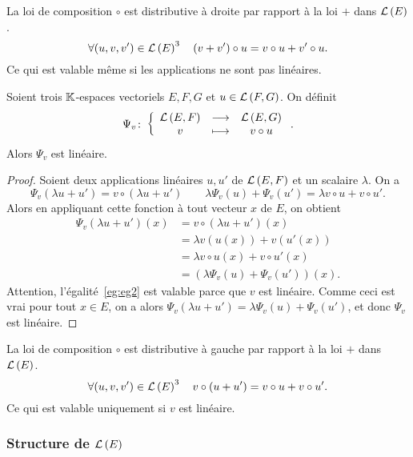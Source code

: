 \begin{cor}
  La loi de composition $\circ$ est distributive à droite par rapport à la loi $+$ dans $\mathcal{L}\left(E\right)$.
  \begin{equation}
    \forall (u,v,v') \in \mathcal{L}\left(E\right)^3 \quad (v+v') \circ u = v \circ u + v' \circ u.
  \end{equation}
  Ce qui est valable même si les applications ne sont pas linéaires.
\end{cor}

\begin{prop}
  Soient trois $\mathbb{K}$-espaces vectoriels $E,F,G$ et $u \in \mathcal{L}\left(F,G\right)$. On définit
  \begin{equation}
  	\Psi_v\colon \left\{\begin{array}{ccc} \mathcal{L}\left(E,F\right) & \longrightarrow &\mathcal{L}\left(E,G\right)\\ v & \longmapsto & v \circ u \end{array} \right..
  \end{equation} 
  Alors $\Psi_v$ est linéaire.
\end{prop}
\begin{proof}
  Soient deux applications linéaires $u,u'$ de $\mathcal{L}\left(E,F\right)$ et un scalaire $\lambda$. On a
  \begin{equation}
    \Psi_v(\lambda u+u')=v \circ (\lambda u+u') \qquad \lambda \Psi_v(u)+\Psi_v(u')=\lambda v \circ u + v \circ u'.
  \end{equation}
  Alors en appliquant cette fonction à tout vecteur $x$ de $E$, on obtient
  \begin{align}
    \Psi_v(\lambda u+u')(x)&=v \circ (\lambda u+u')(x) \\
    &=\lambda v(u(x)) + v(u'(x)) \label{eg:eg2}\\
    &=\lambda v\circ u(x) +v\circ u'(x) \\
    &=(\lambda \Psi_v(u)+\Psi_v(u'))(x).
  \end{align}
  Attention, l'égalité~\eqref{eg:eg2} est valable parce que $v$ est linéaire. Comme ceci est vrai pour tout $x \in E$, on a alors $\Psi_v(\lambda u+u')=\lambda \Psi_v(u)+\Psi_v(u')$, et donc $\Psi_v$ est linéaire.
\end{proof}
\begin{cor}
  La loi de composition $\circ$ est distributive à gauche par rapport à la loi $+$ dans $\mathcal{L}\left(E\right)$.
  \begin{equation}
    \forall (u,v,v') \in \mathcal{L}\left(E\right)^3 \quad v \circ (u+u') = v \circ u + v \circ u'.
  \end{equation}
  Ce qui est valable uniquement si $v$ est linéaire.
\end{cor}

\subsubsection{Structure de $\mathcal{L}\left(E\right)$}

